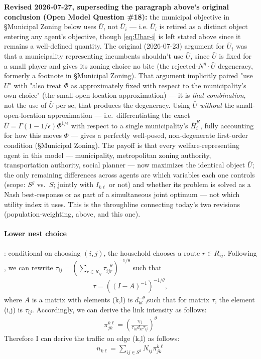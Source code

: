 \documentclass[12pt, a4paper]{article}
\theoremstyle{definition}
\theoremstyle{remark}
\begin{document}
\textbf{Revised 2026-07-27, superseding the paragraph above's original conclusion (Open Model Question \#18):} the municipal objective in \S Municipal Zoning below uses $\bar U$, not $\bar U_i$ — i.e. $\bar U_i$ is retired as a distinct object entering any agent's objective, though \eqref{eq:Ubar-i} is left stated above since it remains a well-defined quantity. The original (2026-07-23) argument for $\bar U_i$ was that a municipality representing incumbents shouldn't use $\bar U$, since $\bar U$ is fixed for a small player and gives its zoning choice no bite (the rejected-$N^g\cdot\bar U$ degeneracy, formerly a footnote in \S Municipal Zoning). That argument implicitly paired "use $\bar U$" with "also treat $\Phi$ as approximately fixed with respect to the municipality's own choice" (the small-open-location approximation) — it is \emph{that combination}, not the use of $\bar U$ per se, that produces the degeneracy. Using $\bar U$ \emph{without} the small-open-location approximation — i.e.\ differentiating the exact $\bar U=\Gamma(1-1/\epsilon)\Phi^{1/\epsilon}$ with respect to a single municipality's $\bar H_i^R$, fully accounting for how this moves $\Phi$ — gives a perfectly well-posed, non-degenerate first-order condition (\S Municipal Zoning). The payoff is that every welfare-representing agent in this model — municipality, metropolitan zoning authority, transportation authority, social planner — now maximizes the identical object $\bar U$; the only remaining differences across agents are which variables each one controls (scope: $S^g$ vs.\ $S$; jointly with $I_{k\ell}$ or not) and whether its problem is solved as a Nash best-response or as part of a simultaneous joint optimum — not which utility index it uses. This is the throughline connecting today's two revisions (population-weighting, above, and this one).

\paragraph{Lower nest choice}: conditional on choosing $(i,j)$, the household chooses a route $r \in R_{ij}$. Following \citet{Allen2022-ms}, we can rewrite $\tau_{ij} = \left(\sum_{r\in R_{ij}}\tau_{ijr}^{-\theta}\right)^{-1/\theta}$ such that
\begin{align}
    \label{eq:pi-route}
    \tau=((I-A)^{-1})^{-1/\theta},
\end{align}
where $A$ is a matrix with elements (k,l) is $d_{kl}^{-\theta}$,such that for matrix $\tau$, the element (i,j) is $\tau_{ij}$.
Accordingly, we can derive the link intensity as follows:
\begin{align}
    \label{eq:edge-intensity}
    \pi_{jk}^{k\ell} = (\frac{\tau_{ij}}{\tau_{ik}d_{kl}\tau_{lj}})^{\theta}
\end{align}
Therefore I can derive the traffic on edge (k,l) as follows:   
\begin{align}
    \label{eq:edge-traffic}
    n_{k\ell} = \sum_{ij \in S^{2}}N_{ij}\pi_{jk}^{k\ell}
\end{align}
\end{document}
